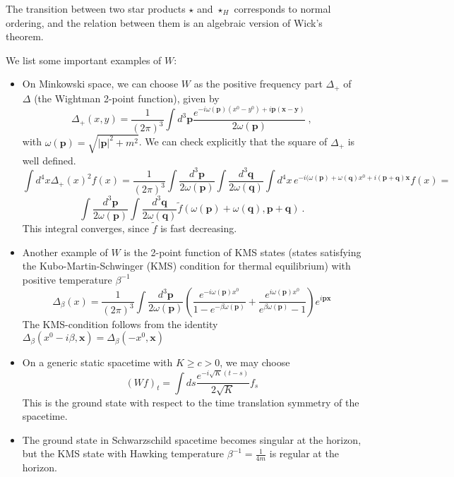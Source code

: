 \documentclass[12pt]{article}
\newcommand{\1}{\mathds{1}}                         %
\begin{document}
{{The transition between two star products $\star$ and $\star_H$ corresponds to normal ordering, and the relation between them is an algebraic version of Wick's theorem. 
\begin{exa}
We list some important examples of $W$:
\begin{itemize}
\item On Minkowski space, we can choose $W$ as the positive frequency part $\Delta_+$ of $\Delta$ (the Wightman 2-point function), given by
\[\Delta_+(x,y)=\frac{1}{(2\pi)^{3}}\int d^3\mathbf p\frac{e^{-i\omega(\mathbf p)(x^0-y^0)+i\mathbf p(\mathbf x-\mathbf y)}}{2\omega(\mathbf p)}\ ,\]
with $\omega(\mathbf p)=\sqrt{|\mathbf p|^2+m^2}$.
We can check explicitly that the square of $\Delta_+$ is well defined.
\[
\int d^4x \Delta_+(x)^2f(x)=\frac{1}{(2\pi)^{3}}\int \frac{d^3\mathbf p}{2\omega(\mathbf p)}\int \frac{d^3{\mathbf q}}{2\omega(\mathbf q)}\int d^4x\, e^{-i(\omega(\mathbf p)+\omega(\mathbf q)x^0+i(\mathbf p+\mathbf q)\mathbf x}f(x)=\]
 \[\int \frac{d^3\mathbf p}{2\omega(\mathbf p)}\int \frac{d^3{\mathbf q}}{2\omega(\mathbf q)}\tilde f(\omega(\mathbf p)+\omega(\mathbf q),\mathbf p+\mathbf q)\ .\]
This integral converges, since $\tilde f$ is fast decreasing.
\item Another example of $W$ is the 2-point function of KMS states (states satisfying the Kubo-Martin-Schwinger (KMS) condition for
thermal equilibrium) with positive temperature $\beta^{-1}$
\[
\Delta_\beta(x)=\frac{1}{(2\pi)^{3}}\int \frac{d^3\mathbf p}{2\omega(\mathbf p)}\left(\frac{e^{-i\omega(\mathbf p)x^0}}{1-e^{-\beta\omega(\mathbf p)}}+\frac{e^{i\omega(\mathbf p)x^0}}{e^{\beta\omega(\mathbf p)}-1}\right)e^{i\mathbf p\mathbf x}
\]
The KMS-condition follows from the identity $\Delta_\beta(x^0-i\beta,\mathbf x)=\Delta_\beta(-x^0,\mathbf x)$
\item On a generic static spacetime with $K\ge c>0$, we may choose
\[(Wf)_t=\int ds \frac{e^{-i\sqrt{K}(t-s)}}{2\sqrt{K}}f_s\]
This is the ground state with respect to the time translation symmetry of the spacetime. 
\item The ground state in Schwarzschild spacetime becomes singular at the horizon, but the KMS state with Hawking temperature $\beta^{-1}=\frac{1}{4m}$ is regular at the horizon.
\end{itemize}
 \end{exa}
 
}}
\end{document}
